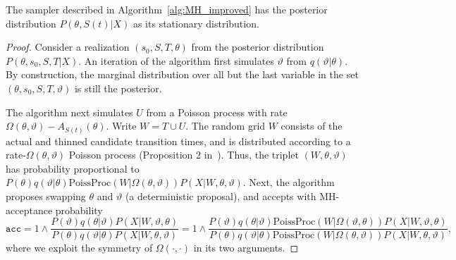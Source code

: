 \begin{proposition}
  The sampler described in Algorithm~\ref{alg:MH_improved} has the posterior distribution $P(\theta,S(t)|X)$ as its stationary distribution.
\end{proposition}
\begin{proof}
  Consider a realization $(s_0,S,T,\theta)$ from the posterior distribution $P(\theta, s_0, S, T|X)$. An iteration of the algorithm first simulates $\vartheta$ from $q(\vartheta|\theta)$. By construction, the marginal distribution over all but the last variable in the set $(\theta, s_0, S, T, \vartheta)$ is still the posterior.

  The algorithm next simulates $U$ from a Poisson process with rate $\Omega(\theta,\vartheta) - A_{S(t)}(\theta)$. Write $W = T \cup U$.
  The random grid $W$ consists of the actual and thinned candidate transition times, and is distributed according to a rate-$\Omega(\theta, \vartheta)$ Poisson process (Proposition 2 in~\cite{RaoTeh13}). 
  Thus, the triplet $(W,\theta,\vartheta)$ has probability proportional to $P(\theta)q(\vartheta|\theta)\text{PoissProc}(W|\Omega(\theta,\vartheta)) P(X|W,\theta,\vartheta)$.
  Next, the algorithm proposes swapping $\theta$ and $\vartheta$ 
  (a deterministic proposal), and accepts with MH-acceptance probability 
  $$\texttt{acc} = 
  1 \wedge \frac{P(\vartheta)q(\theta|\vartheta)
P(X|W,\vartheta,\theta)}{P(\theta)q(\vartheta|\theta)
P(X|W,\theta,\vartheta)} =
1 \wedge \frac{P(\vartheta)q(\theta|\vartheta)\text{PoissProc}(W|\Omega(\vartheta,\theta)) P(X|W,\vartheta,\theta)}{P(\theta)q(\vartheta|\theta)\text{PoissProc}(W|\Omega(\theta,\vartheta))
P(X|W,\theta,\vartheta)},$$
where we exploit the symmetry of $\Omega(\cdot,\cdot)$ in its two arguments.


\end{proof}
